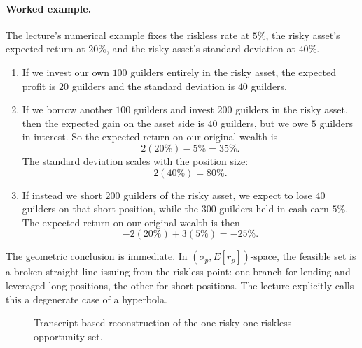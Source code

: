 \paragraph{Worked example.}
The lecture's numerical example fixes the riskless rate at \(5\%\), the risky asset's expected return at \(20\%\), and the risky asset's standard deviation at \(40\%\).

\begin{enumerate}
\item If we invest our own \(100\) guilders entirely in the risky asset, the expected profit is \(20\) guilders and the standard deviation is \(40\) guilders.
\item If we borrow another \(100\) guilders and invest \(200\) guilders in the risky asset, then the expected gain on the asset side is \(40\) guilders, but we owe \(5\) guilders in interest. So the expected return on our original wealth is
\begin{equation}
2(20\%) - 5\% = 35\%.
\end{equation}
The standard deviation scales with the position size:
\begin{equation}
2(40\%) = 80\%.
\end{equation}
\item If instead we short \(200\) guilders of the risky asset, we expect to lose \(40\) guilders on that short position, while the \(300\) guilders held in cash earn \(5\%\). The expected return on our original wealth is then
\begin{equation}
-2(20\%) + 3(5\%) = -25\%.
\end{equation}
\end{enumerate}

The geometric conclusion is immediate. In \((\sigma_p, E[r_p])\)-space, the feasible set is a broken straight line issuing from the riskless point: one branch for lending and leveraged long positions, the other for short positions. The lecture explicitly calls this a degenerate case of a hyperbola.

\begin{figure}[h]
\centering
{}
\caption{Transcript-based reconstruction of the one-risky-one-riskless opportunity set.}
\end{figure}

